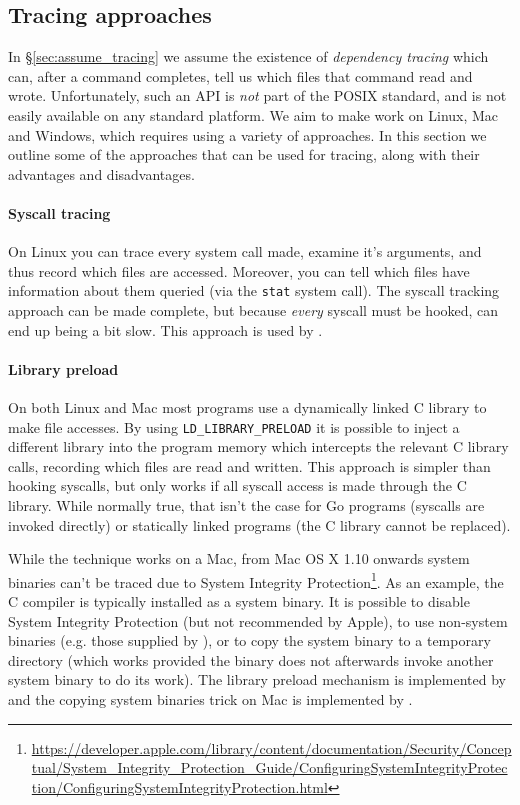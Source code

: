 \subsection{Tracing approaches}
\label{sec:tracing}

In \S\ref{sec:assume_tracing} we assume the existence of \emph{dependency tracing} which can, after a command completes, tell us which files that command read and wrote. Unfortunately, such an API is \emph{not} part of the POSIX standard, and is not easily available on any standard platform. We aim to make \Rattle work on Linux, Mac and Windows, which requires using a variety of approaches. In this section we outline some of the approaches that can be used for tracing, along with their advantages and disadvantages.

\paragraph{Syscall tracing} On Linux you can trace every system call made, examine it's arguments, and thus record which files are accessed. Moreover, you can tell which files have information about them queried (via the \texttt{stat} system call). The syscall tracking approach can be made complete, but because \emph{every} syscall must be hooked, can end up being a bit slow. This approach is used by \Bigbro \cite{bigbro}.

\paragraph{Library preload} On both Linux and Mac most programs use a dynamically linked C library to make file accesses. By using \texttt{LD\_LIBRARY\_PRELOAD} it is possible to inject a different library into the program memory which intercepts the relevant C library calls, recording which files are read and written. This approach is simpler than hooking syscalls, but only works if all syscall access is made through the C library. While normally true, that isn't the case for Go programs \cite{go} (syscalls are invoked directly) or statically linked programs (the C library cannot be replaced).

While the technique works on a Mac, from Mac OS X 1.10 onwards system binaries can't be traced due to System Integrity Protection\footnote{\url{https://developer.apple.com/library/content/documentation/Security/Conceptual/System_Integrity_Protection_Guide/ConfiguringSystemIntegrityProtection/ConfiguringSystemIntegrityProtection.html}}. As an example, the C compiler is typically installed as a system binary. It is possible to disable System Integrity Protection (but not recommended by Apple), to use non-system binaries (e.g. those supplied by \Nix \cite{nix}), or to copy the system binary to a temporary directory (which works provided the binary does not afterwards invoke another system binary to do its work). The library preload mechanism is implemented by \Fsatrace \cite{fsatrace} and the copying system binaries trick on Mac is implemented by \Shake \cite{shake}.

